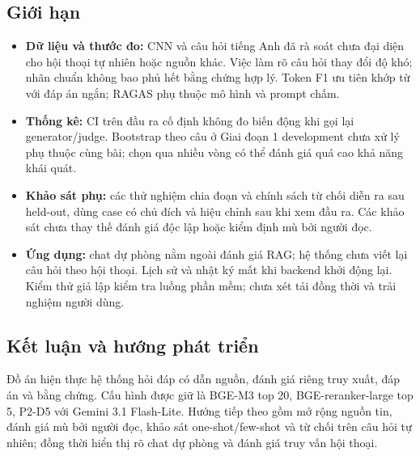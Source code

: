 \subsection{Giới hạn}
\begin{itemize}
\item \textbf{Dữ liệu và thước đo:} CNN và câu hỏi tiếng Anh đã rà soát chưa đại diện cho hội thoại tự nhiên hoặc nguồn khác. Việc làm rõ câu hỏi thay đổi độ khó; nhãn chuẩn không bao phủ hết bằng chứng hợp lý. Token F1 ưu tiên khớp từ với đáp án ngắn; RAGAS phụ thuộc mô hình và prompt chấm.
\item \textbf{Thống kê:} CI trên đầu ra cố định không đo biến động khi gọi lại generator/judge. Bootstrap theo câu ở Giai đoạn 1 development chưa xử lý phụ thuộc cùng bài; chọn qua nhiều vòng có thể đánh giá quá cao khả năng khái quát.
\item \textbf{Khảo sát phụ:} các thử nghiệm chia đoạn và chính sách từ chối diễn ra sau held-out, dùng case có chủ đích và hiệu chỉnh sau khi xem đầu ra. Các khảo sát chưa thay thế đánh giá độc lập hoặc kiểm định mù bởi người đọc.
\item \textbf{Ứng dụng:} chat dự phòng nằm ngoài đánh giá RAG; hệ thống chưa viết lại câu hỏi theo hội thoại. Lịch sử và nhật ký mất khi backend khởi động lại. Kiểm thử giả lập kiểm tra luồng phần mềm; chưa xét tải đồng thời và trải nghiệm người dùng.
\end{itemize}

\subsection{Kết luận và hướng phát triển}
Đồ án hiện thực hệ thống hỏi đáp có dẫn nguồn, đánh giá riêng truy xuất, đáp án và bằng chứng. Cấu hình được giữ là BGE-M3 top 20, BGE-reranker-large top 5, P2-D5 với Gemini 3.1 Flash-Lite. Hướng tiếp theo gồm mở rộng nguồn tin, đánh giá mù bởi người đọc, khảo sát one-shot/few-shot và từ chối trên câu hỏi tự nhiên; đồng thời hiển thị rõ chat dự phòng và đánh giá truy vấn hội thoại.
